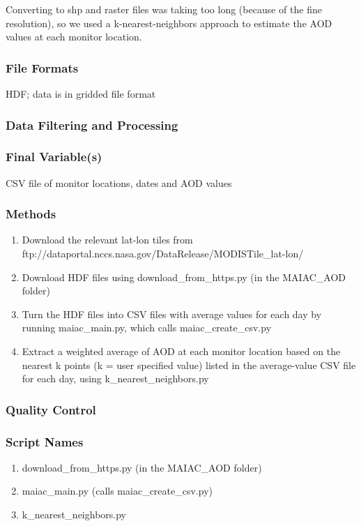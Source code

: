 Converting to shp and raster files was taking too long (because of the fine resolution), so we used a k-nearest-neighbors approach to estimate the AOD values at each monitor location. 

\subsubsection*{File Formats} 
HDF; data is in gridded file format

\subsubsection*{Data Filtering and Processing}

\subsubsection*{Final Variable(s)}
CSV file of monitor locations, dates and AOD values

\subsubsection*{Methods}

\begin{enumerate}
\item Download the relevant lat-lon tiles from ftp://dataportal.nccs.nasa.gov/DataRelease/MODISTile_lat-lon/
\item Download HDF files using download_from_https.py (in the MAIAC_AOD folder) 
\item Turn the HDF files into CSV files with average values for each day by running maiac_main.py, which calls maiac_create_csv.py
\item Extract a weighted average of AOD at each monitor location based on the nearest k points (k = user specified value) listed in the average-value CSV file for each day, using k_nearest_neighbors.py
\end{enumerate}

\subsubsection*{Quality Control}

\subsubsection*{Script Names}

\begin{enumerate}
\item download_from_https.py (in the MAIAC_AOD folder)
\item maiac_main.py (calls maiac_create_csv.py)
\item k_nearest_neighbors.py
\end{enumerate}

